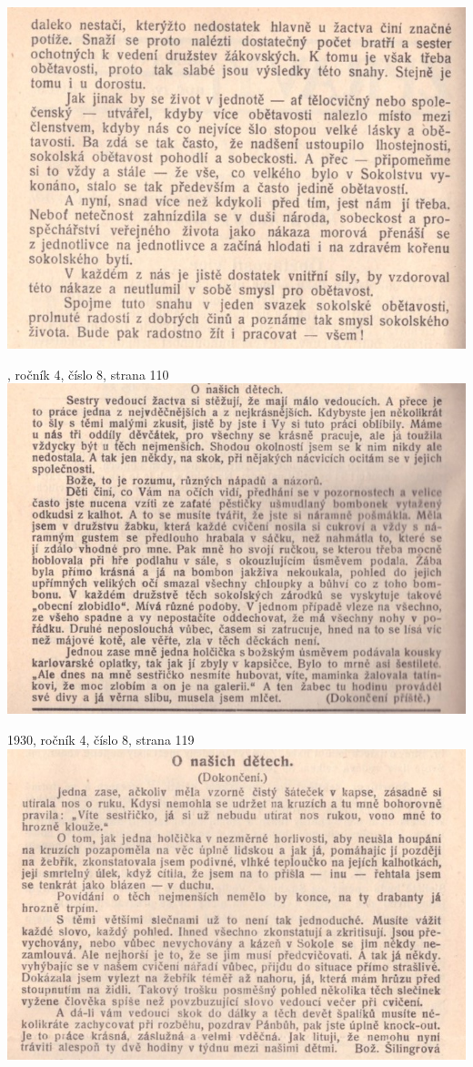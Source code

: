 \documentclass[11pt]{article}
\begin{document}
\includegraphics[width=\imagewidth]{original/1930/Skener_20250316 (11).jpg}

, ročník 4, číslo 8, strana 110 \\
\includegraphics[width=\imagewidth]{original/1930/Skener_20250316 (14).jpg}

\vspace*{\baselineskip}
1930, ročník 4, číslo 8, strana 119 \\
\includegraphics[width=\imagewidth]{original/1930/Skener_20250316 (13).jpg}
\end{document}

